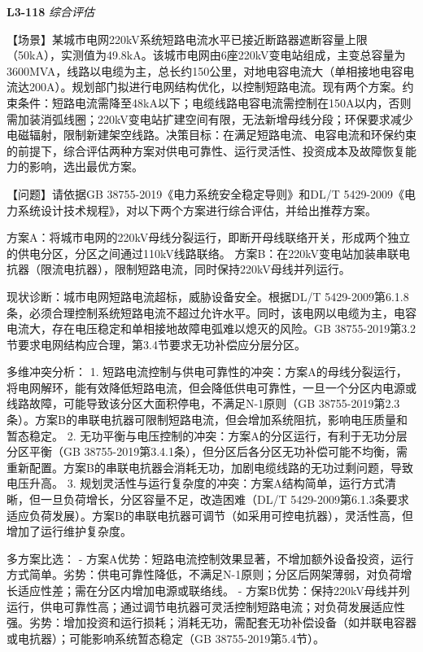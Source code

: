 \documentclass[12pt,a4paper]{ctexart}
\begin{document}
\noindent\textbf{L3-118} \hfill \textit{综合评估}
\begin{description}[leftmargin=1.5em,style=nextline,font=\normalfont]
  \item[Q:] 【场景】某城市电网220kV系统短路电流水平已接近断路器遮断容量上限（50kA），实测值为49.8kA。该城市电网由6座220kV变电站组成，主变总容量为3600MVA，线路以电缆为主，总长约150公里，对地电容电流大（单相接地电容电流达200A）。规划部门拟进行电网结构优化，以控制短路电流。现有两个方案。约束条件：短路电流需降至48kA以下；电缆线路电容电流需控制在150A以内，否则需加装消弧线圈；220kV变电站扩建空间有限，无法新增母线分段；环保要求减少电磁辐射，限制新建架空线路。决策目标：在满足短路电流、电容电流和环保约束的前提下，综合评估两种方案对供电可靠性、运行灵活性、投资成本及故障恢复能力的影响，选出最优方案。

【问题】请依据GB 38755-2019《电力系统安全稳定导则》和DL/T 5429-2009《电力系统设计技术规程》，对以下两个方案进行综合评估，并给出推荐方案。

方案A：将城市电网的220kV母线分裂运行，即断开母线联络开关，形成两个独立的供电分区，分区之间通过110kV线路联络。
方案B：在220kV变电站加装串联电抗器（限流电抗器），限制短路电流，同时保持220kV母线并列运行。
  \item[A:] 现状诊断：城市电网短路电流超标，威胁设备安全。根据DL/T 5429-2009第6.1.8条，必须合理控制系统短路电流不超过允许水平。同时，该电网以电缆为主，电容电流大，存在电压稳定和单相接地故障电弧难以熄灭的风险。GB 38755-2019第3.2节要求电网结构应合理，第3.4节要求无功补偿应分层分区。

多维冲突分析：
1. 短路电流控制与供电可靠性的冲突：方案A的母线分裂运行，将电网解环，能有效降低短路电流，但会降低供电可靠性，一旦一个分区内电源或线路故障，可能导致该分区大面积停电，不满足N-1原则（GB 38755-2019第2.3条）。方案B的串联电抗器可限制短路电流，但会增加系统阻抗，影响电压质量和暂态稳定。
2. 无功平衡与电压控制的冲突：方案A的分区运行，有利于无功分层分区平衡（GB 38755-2019第3.4.1条），但分区后各分区无功补偿可能不均衡，需重新配置。方案B的串联电抗器会消耗无功，加剧电缆线路的无功过剩问题，导致电压升高。
3. 规划灵活性与运行复杂度的冲突：方案A结构简单，运行方式清晰，但一旦负荷增长，分区容量不足，改造困难（DL/T 5429-2009第6.1.3条要求适应负荷发展）。方案B的串联电抗器可调节（如采用可控电抗器），灵活性高，但增加了运行维护复杂度。

多方案比选：
- 方案A优势：短路电流控制效果显著，不增加额外设备投资，运行方式简单。劣势：供电可靠性降低，不满足N-1原则；分区后网架薄弱，对负荷增长适应性差；需在分区内增加电源或联络线。
- 方案B优势：保持220kV母线并列运行，供电可靠性高；通过调节电抗器可灵活控制短路电流；对负荷发展适应性强。劣势：增加投资和运行损耗；消耗无功，需配套无功补偿设备（如并联电容器或电抗器）；可能影响系统暂态稳定（GB 38755-2019第5.4节）。


\end{description}
\end{document}

